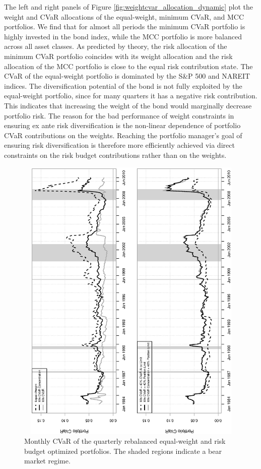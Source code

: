 \documentclass[12pt,a4paper]{article}
\begin{document}
The left and right panels of Figure \ref{fig:weightcvar_allocation_dynamic} plot the weight and CVaR allocations of the equal-weight, minimum CVaR, and MCC portfolios. We find that for almost all periods the minimum CVaR portfolio is highly invested in the bond index, while the MCC portfolio is more balanced across all asset classes. As predicted by theory, the risk allocation of the minimum CVaR portfolio coincides with its weight allocation and the risk allocation of the MCC portfolio is close to the equal risk contribution state. The CVaR of the equal-weight portfolio is dominated by the S\&P 500 and NAREIT indices. The diversification potential of the bond is not fully exploited by the equal-weight portfolio, since for many quarters it has a negative risk contribution. This indicates that increasing the weight of the bond would marginally decrease portfolio risk.  The reason for the bad performance of weight constraints in ensuring ex ante risk diversification is the non-linear dependence of portfolio CVaR contributions on the weights. Reaching the portfolio manager's goal of ensuring risk diversification is therefore more efficiently achieved via direct constraints on the risk budget contributions rather than on the weights.

\begin{figure}[h]
\begin{center}
\caption{Monthly CVaR of the quarterly rebalanced equal-weight and risk budget optimized portfolios. The shaded regions indicate a bear market regime.\label{fig:CVaR_dynamic}   }
\includegraphics[width=12cm,height=14cm,angle=270]{portfolioCVaR_CC.eps}
\end{center}
\end{figure}
\end{document}
